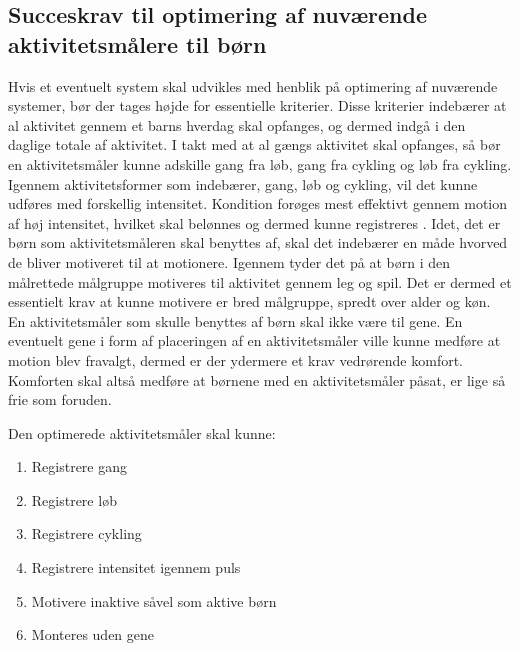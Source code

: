 \subsection{Succeskrav til optimering af nuværende aktivitetsmålere til børn}
Hvis et eventuelt system skal udvikles med henblik på optimering af nuværende systemer, bør der tages højde for essentielle kriterier. Disse kriterier indebærer at al aktivitet gennem et barns hverdag skal opfanges, og dermed indgå i den daglige totale af aktivitet. I takt med at al gængs aktivitet skal opfanges, så bør en aktivitetsmåler kunne adskille gang fra løb, gang fra cykling og løb fra cykling. Igennem aktivitetsformer som indebærer, gang, løb og cykling, vil det kunne udføres med forskellig intensitet. Kondition forøges mest effektivt gennem motion af høj intensitet, hvilket skal belønnes og dermed kunne registreres \citep{Hjerteforeningen}. Idet, det er børn som aktivitetsmåleren skal benyttes af, skal det indebærer en måde hvorved de bliver motiveret til at motionere. Igennem  tyder det på at børn i den målrettede målgruppe motiveres til aktivitet gennem leg og spil. Det er dermed et essentielt krav at kunne motivere er bred målgruppe, spredt over alder og køn. En aktivitetsmåler som skulle benyttes af børn skal ikke være til gene. En eventuelt gene i form af placeringen af en aktivitetsmåler ville kunne medføre at motion blev fravalgt, dermed er der ydermere et krav vedrørende komfort. Komforten skal altså medføre at børnene med en aktivitetsmåler påsat, er lige så frie som foruden.

Den optimerede aktivitetsmåler skal kunne: 
\begin{enumerate}
\item Registrere gang
\item Registrere løb
\item Registrere cykling
\item Registrere intensitet igennem puls
\item Motivere inaktive såvel som aktive børn
\item Monteres uden gene
\end{enumerate}
